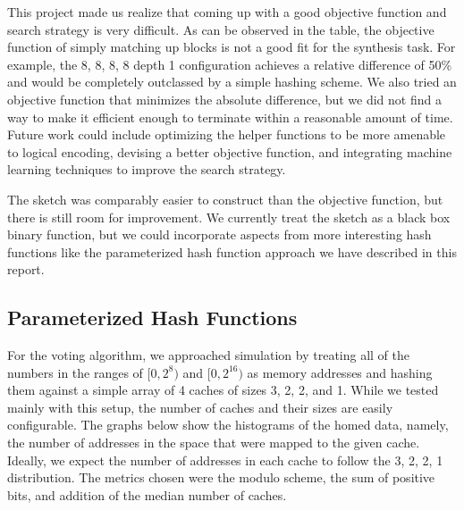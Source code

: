 This project made us realize that coming up with a good objective function and
search strategy is very difficult. As can be observed in the table, the
objective function of simply matching up blocks is not a good fit for the
synthesis task. For example, the 8, 8, 8, 8 depth 1 configuration achieves a
relative difference of 50\% and would be completely outclassed by a simple
hashing scheme. We also tried an objective function that minimizes the absolute
difference, but we did not find a way to make it efficient enough to terminate
within a reasonable amount of time. Future work could include optimizing the
helper functions to be more amenable to logical encoding, devising a better
objective function, and integrating machine learning techniques to improve the
search strategy.

The sketch was comparably easier to construct than the objective function, but
there is still room for improvement. We currently treat the sketch as a black
box binary function, but we could incorporate aspects from more interesting hash
functions like the parameterized hash function approach we have described in
this report.

\subsection{Parameterized Hash Functions}

For the voting algorithm, we approached simulation by treating all of the
numbers in the ranges of $[0, 2^{8})$ and $[0, 2^{16})$ as memory addresses and
hashing them against a simple array of 4 caches of sizes 3, 2, 2, and 1.  While
we tested mainly with this setup, the number of caches and their sizes are
easily configurable.  The graphs below show the histograms of the homed data,
namely, the number of addresses in the space that were mapped to the given
cache.  Ideally, we expect the number of addresses in each cache to follow the
3, 2, 2, 1 distribution.  The metrics chosen were the modulo scheme, the sum of
positive bits, and addition of the median number of caches.

